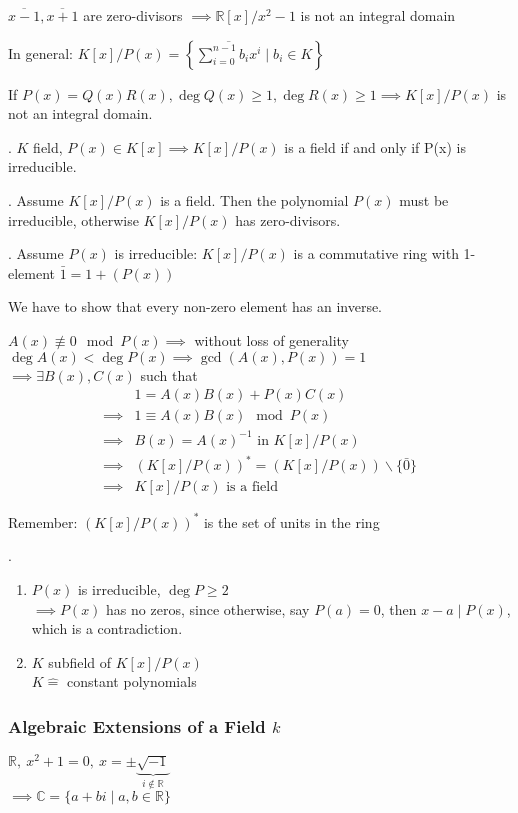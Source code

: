 $\overline{x-1}, \overline{x+1}$ are zero-divisors $\implies \mathbb{R}[x] / x^2 -1$ is not an integral domain

In general: $K[x] / P(x) = \left\{ \overline{\sum_{i=0}^{n-1} b_i x^i} \mid b_i \in K\right\}$

If $P(x) = Q(x)R(x), \deg Q(x) \geq 1, \deg R(x) \geq 1 \implies K[x] / P(x)$ is not an integral domain.

\Theorem.
$K$ field, $P(x) \in K[x] \implies K[x] / P(x)$ is a field if and only if P(x) is irreducible.

\ProofForward.
Assume $K[x] / P(x)$ is a field. Then the polynomial $P(x)$ must be irreducible, otherwise $K[x] / P(x)$ has zero-divisors.

\ProofBackward. Assume $P(x)$ is irreducible:
$K[x] / P(x)$ is a commutative ring with 1-element $\bar{1} = 1+ (P(x))$

We have to show that every non-zero element has an inverse.

$A(x) \not\equiv 0 \mod P(x) \implies $ without loss of generality $\deg A(x) < \deg P(x) \implies \gcd(A(x), P(x)) = 1$\\
$\implies \exists B(x), C(x)$ such that
\begin{align*}
  & 1 = A(x)B(x) + P(x)C(x)\\
  \implies & 1 \equiv A(x) B(x) \mod P(x) \\
  \implies & B(x) = A(x)^{-1} \text{ in } K[x] / P(x) \\
  \implies & (K[x] / P(x))^{*} = (K[x]/P(x)) \backslash \{\bar{0}\} \\
  \implies & K[x] / P(x) \text{ is a field}
\end{align*}

Remember: $(K[x] / P(x))^{*}$ is the set of units in the ring

\Remark.
\begin{enumerate}[1)]
  \item $P(x)$ is irreducible, $\deg P \geq 2$\\
  $\implies P(x)$ has no zeros, since otherwise, say $P(a) = 0$, then $x - a ∣ P(x)$, which is a contradiction.

  \item $K$ subfield of $K[x]/P(x)$\\
  $K\hat{=}$ constant polynomials
\end{enumerate}

\subsubsection{Algebraic Extensions of a Field $k$}
$\mathbb{R}, ~ x^2 +1 = 0, ~ x = \pm \underbrace{\sqrt{-1}}_{i ∉ ℝ}$ \\
$\implies \mathbb{C} = \{a+bi \mid a,b \in \mathbb{R} \}$

